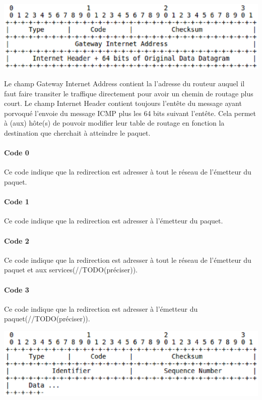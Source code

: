\includegraphics[width=15cm]{./pics/header2.eps}

Le champ Gateway Internet Address contient la l'adresse du routeur auquel il
faut faire transiter le traffique directement pour avoir un chemin de routage
plus court.  Le champ Internet Header contient toujours l'entête du message
ayant porvoqué l'envoie du message ICMP plus les 64 bits suivant l'entête. Cela
permet à (aux) hôte(s) de pouvoir modifier leur table de routage en fonction la
destination que cherchait à atteindre le paquet.

\paragraph{Code 0}
Ce code indique que la redirection est adresser à tout le réseau de l'émetteur du
paquet.

\paragraph{Code 1}
Ce code indique que la redirection est adresser à l'émetteur du paquet.

\paragraph{Code 2}
Ce code indique que la redirection est adresser à tout le réseau de l'émetteur
du paquet et aux services(//TODO(préciser)).

\paragraph{Code 3} Ce code indique que la redirection est adresser à l'émetteur
du paquet(//TODO(préciser)).

\includegraphics[width=15cm]{./pics/header3.eps}

